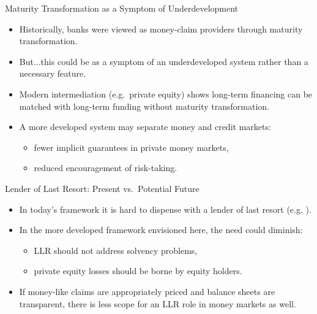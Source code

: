 \documentclass[11pt,aspectratio=169]{beamer}
\begin{document}
\begin{frame}{Maturity Transformation as a Symptom of Underdevelopment}
\small
\begin{itemize}
  \item Historically, banks were viewed as money-claim providers through maturity transformation.
  \item But...this could be as a symptom of an underdeveloped system rather than a necessary feature.
  \item Modern intermediation (e.g.\ private equity) shows long-term financing can be matched with long-term funding without maturity transformation.
  \item A more developed system may separate money and credit markets:
  \begin{itemize}
    \item fewer implicit guarantees in private money markets,
    \item reduced encouragement of risk-taking.
  \end{itemize}
\end{itemize}
\end{frame}

\begin{frame}{Lender of Last Resort: Present vs.\ Potential Future}
\small
\begin{itemize}
  \item In today’s framework it is hard to dispense with a lender of last resort (e.g. \cite{goodhart1999}).
  \item In the more developed framework envisioned here, the need could diminish:
  \begin{itemize}
    \item LLR should not address solvency problems,
    \item private equity losses should be borne by equity holders.
  \end{itemize}
  \item If money-like claims are appropriately priced and balance sheets are transparent,
  there is less scope for an LLR role in money markets as well.
\end{itemize}
\end{frame}
\end{document}
